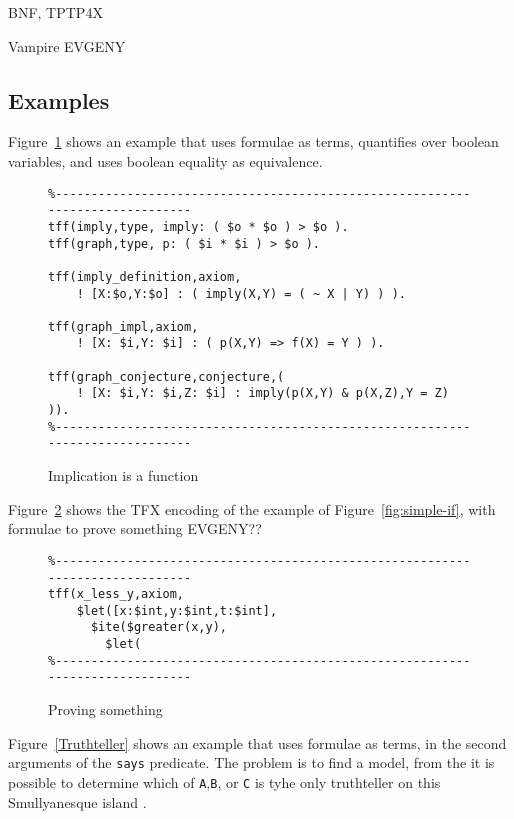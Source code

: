 \documentclass{easychair}
\begin{document}
BNF, TPTP4X

Vampire EVGENY

\subsection{Examples}
\label{Examples}

Figure~\ref{ImplicationFunction} shows an example that uses formulae as
terms, quantifies over boolean variables, and uses boolean equality as 
equivalence.

\begin{figure}[htbp]
\begin{small}
\begin{verbatim}
%------------------------------------------------------------------------------
tff(imply,type, imply: ( $o * $o ) > $o ).
tff(graph,type, p: ( $i * $i ) > $o ).

tff(imply_definition,axiom,
    ! [X:$o,Y:$o] : ( imply(X,Y) = ( ~ X | Y) ) ).

tff(graph_impl,axiom,
    ! [X: $i,Y: $i] : ( p(X,Y) => f(X) = Y ) ).

tff(graph_conjecture,conjecture,(
    ! [X: $i,Y: $i,Z: $i] : imply(p(X,Y) & p(X,Z),Y = Z) )).
%------------------------------------------------------------------------------
\end{verbatim}
\end{small}
\caption{Implication is a function}
\label{ImplicationFunction}
\end{figure}

Figure~\ref{LetITE} shows the TFX encoding of the example of 
Figure~\ref{fig:simple-if}, with formulae to prove something EVGENY??

\begin{figure}[htbp]
\begin{small}
\begin{verbatim}
%------------------------------------------------------------------------------
tff(x_less_y,axiom,
    $let([x:$int,y:$int,t:$int],
      $ite($greater(x,y),
        $let(
%------------------------------------------------------------------------------
\end{verbatim}
\end{small}
\caption{Proving something}
\label{LetITE}
\end{figure}

Figure~\ref{Truthteller} shows an example that uses formulae as terms, in
the second arguments of the {\tt says} predicate.
The problem is to find a model, from the it is possible to determine which
of {\tt A},{\tt B}, or {\tt C} is tyhe only truthteller on this
Smullyanesque island \cite{Smu78}.
\end{document}
